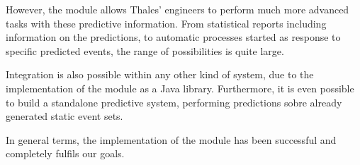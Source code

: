 \documentclass[a4paper,12pt]{article}
\begin{document}
However, the module allows Thales' engineers to perform much more advanced tasks with these predictive information. From statistical reports including information on the predictions, to automatic processes started as response to specific predicted events, the range of possibilities is quite large.

Integration is also possible within any other kind of system, due to the implementation of the module as a Java library. Furthermore, it is even possible to build a standalone predictive system, performing predictions sobre already generated static event sets.

In general terms, the implementation of the module has been successful and completely fulfils our goals.

\clearpage

 

\end{document}

